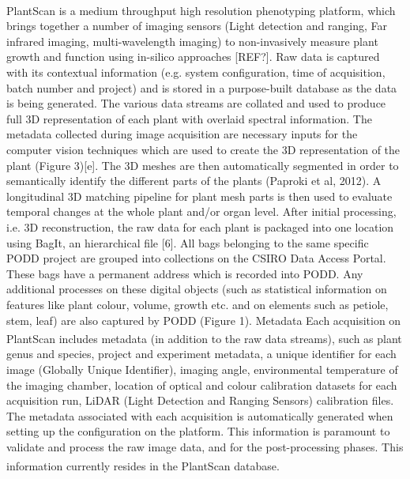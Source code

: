 \documentclass{llncs}
\begin{document}
PlantScan\textsuperscript{\texttrademark} is a medium throughput high resolution phenotyping platform, which
brings together a number of imaging sensors (Light detection and ranging, Far
infrared imaging, multi-wavelength imaging) to non-invasively measure plant
growth and function using in-silico approaches [REF?]. Raw data is captured with
its contextual information (e.g. system configuration, time of acquisition,
batch number and project) and is stored in a purpose-built database as the data
is being generated. The various data streams are collated and used to produce
full 3D representation of each plant with overlaid spectral information. The
metadata collected during image acquisition are necessary inputs for the
computer vision techniques which are used to create the 3D representation of the
plant (Figure 3)[e]. The 3D meshes are then automatically segmented in order to
semantically identify the different parts of the plants (Paproki et al, 2012). A
longitudinal 3D matching pipeline for plant mesh parts is then used to evaluate 
temporal changes at the whole plant and/or organ level. After initial
processing, i.e. 3D reconstruction, the raw data for each plant is packaged into
one location using BagIt, an hierarchical file [6]. All bags belonging to the
same specific PODD project are grouped into collections on the CSIRO Data Access
Portal. These bags have a permanent address which is recorded into PODD. Any
additional processes on these digital objects (such as statistical information
on features like plant colour, volume,  growth etc. and on elements such as
petiole, stem, leaf) are also captured by PODD (Figure 1). Metadata
Each acquisition on PlantScan\textsuperscript{\texttrademark} includes metadata (in addition to the raw data
streams), such as plant genus and species, project and experiment metadata, a
unique identifier for each image (Globally Unique Identifier), imaging angle,
environmental temperature of the imaging chamber, location of optical and colour
calibration datasets for each acquisition run, LiDAR (Light Detection and
Ranging Sensors) calibration files. The metadata associated with each
acquisition is automatically generated when setting up the configuration on the
platform. This information is paramount to validate and process the raw image
data, and for the post-processing phases. This information currently resides in
the PlantScan\textsuperscript{\texttrademark} database.
\end{document}
